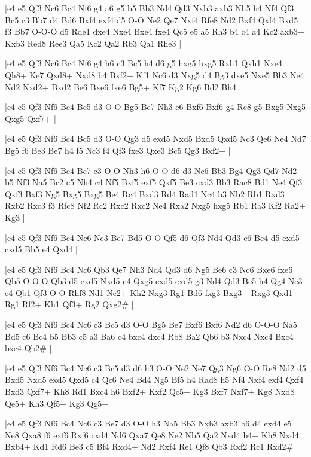 \whitename{}
\blackname{}
\makegametitle
|e4 e5 Qf3 Nc6 Bc4 Nf6 g4 a6 g5 b5 Bb3 Nd4 Qd3 Nxb3 axb3 Nh5 h4 Nf4 Qf3 Bc5 c3 Bb7 d4 Bd6 Bxf4 exf4 d5 O-O Ne2 Qe7 Nxf4 Rfe8 Nd2 Bxf4 Qxf4 Bxd5 f3 Bb7 O-O-O d5 Rde1 dxe4 Nxe4 Bxe4 fxe4 Qc5 e5 a5 Rh3 b4 c4 a4 Kc2 axb3+ Kxb3 Red8 Ree3 Qa5 Kc2 Qa2 Rb3 Qa1 Rhe3  |

\whitename{}
\blackname{}
\makegametitle
|e4 e5 Qf3 Nc6 Bc4 Nf6 g4 h6 c3 Bc5 h4 d6 g5 hxg5 hxg5 Rxh1 Qxh1 Nxe4 Qh8+ Ke7 Qxd8+ Nxd8 b4 Bxf2+ Kf1 Nc6 d3 Nxg5 d4 Bg3 dxe5 Nxe5 Bb3 Ne4 Nd2 Nxd2+ Bxd2 Be6 Bxe6 fxe6 Bg5+ Kf7 Kg2 Kg6 Bd2 Bh4  |

\whitename{}
\blackname{}
\makegametitle
|e4 e5 Qf3 Nf6 Bc4 Bc5 d3 O-O Bg5 Be7 Nh3 c6 Bxf6 Bxf6 g4 Re8 g5 Bxg5 Nxg5 Qxg5 Qxf7+  |

\whitename{}
\blackname{}
\makegametitle
|e4 e5 Qf3 Nf6 Bc4 Bc5 d3 O-O Qg3 d5 exd5 Nxd5 Bxd5 Qxd5 Nc3 Qe6 Ne4 Nd7 Bg5 f6 Be3 Be7 h4 f5 Nc3 f4 Qf3 fxe3 Qxe3 Bc5 Qg3 Bxf2+  |

\whitename{}
\blackname{}
\makegametitle
|e4 e5 Qf3 Nf6 Bc4 Be7 c3 O-O Nh3 h6 O-O d6 d3 Nc6 Bb3 Bg4 Qg3 Qd7 Nd2 b5 Nf3 Na5 Bc2 c5 Nh4 c4 Nf5 Bxf5 exf5 Qxf5 Be3 cxd3 Bb3 Rac8 Bd1 Ne4 Qf3 Qxf3 Bxf3 Ng5 Bxg5 Bxg5 Be4 Rc4 Bxd3 Rd4 Rad1 Nc4 b3 Nb2 Rb1 Rxd3 Rxb2 Rxc3 f3 Rfc8 Nf2 Rc2 Rxc2 Rxc2 Ne4 Rxa2 Nxg5 hxg5 Rb1 Ra3 Kf2 Ra2+ Kg3  |

\whitename{}
\blackname{}
\makegametitle
|e4 e5 Qf3 Nf6 Bc4 Nc6 Nc3 Be7 Bd5 O-O Qf5 d6 Qf3 Nd4 Qd3 c6 Bc4 d5 exd5 cxd5 Bb5 e4 Qxd4  |

\whitename{}
\blackname{}
\makegametitle
|e4 e5 Qf3 Nf6 Bc4 Nc6 Qb3 Qe7 Nh3 Nd4 Qd3 d6 Ng5 Be6 c3 Nc6 Bxe6 fxe6 Qb5 O-O-O Qb3 d5 exd5 Nxd5 c4 Qxg5 cxd5 exd5 g3 Nd4 Qd3 Bc5 h4 Qg4 Nc3 e4 Qb1 Qf3 O-O Rhf8 Nd1 Ne2+ Kh2 Nxg3 Rg1 Bd6 fxg3 Bxg3+ Rxg3 Qxd1 Rg1 Rf2+ Kh1 Qf3+ Rg2 Qxg2\#  |

\whitename{}
\blackname{}
\makegametitle
|e4 e5 Qf3 Nf6 Bc4 Nc6 c3 Bc5 d3 O-O Bg5 Be7 Bxf6 Bxf6 Nd2 d6 O-O-O Na5 Bd5 c6 Bc4 b5 Bb3 c5 a3 Ba6 c4 bxc4 dxc4 Rb8 Ba2 Qb6 b3 Nxc4 Nxc4 Bxc4 bxc4 Qb2\#  |

\whitename{}
\blackname{}
\makegametitle
|e4 e5 Qf3 Nf6 Bc4 Nc6 c3 Bc5 d3 d6 h3 O-O Ne2 Ne7 Qg3 Ng6 O-O Re8 Nd2 d5 Bxd5 Nxd5 exd5 Qxd5 c4 Qc6 Ne4 Bd4 Ng5 Bf5 h4 Rad8 h5 Nf4 Nxf4 exf4 Qxf4 Bxd3 Qxf7+ Kh8 Rd1 Bxc4 h6 Bxf2+ Kxf2 Qc5+ Kg3 Bxf7 Nxf7+ Kg8 Nxd8 Qe5+ Kh3 Qf5+ Kg3 Qg5+  |

\whitename{}
\blackname{}
\makegametitle
|e4 e5 Qf3 Nf6 Bc4 Nc6 c3 Be7 d3 O-O h3 Na5 Bb3 Nxb3 axb3 b6 d4 exd4 e5 Ne8 Qxa8 f6 exf6 Rxf6 cxd4 Nd6 Qxa7 Qe8 Ne2 Nb5 Qa2 Nxd4 b4+ Kh8 Nxd4 Bxb4+ Kd1 Rd6 Be3 c5 Bf4 Rxd4+ Nd2 Rxf4 Re1 Qf8 Qb3 Rxf2 Rc1 Rxd2\#  |

